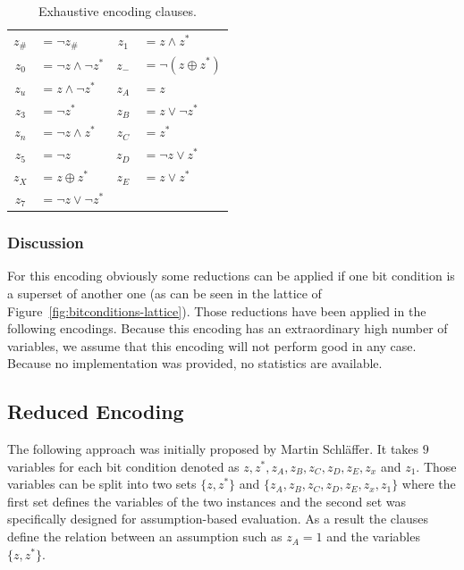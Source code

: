\begin{table}[b]
  \begin{center}
    \begin{tabular}{cp{5cm}cl}
      $z_\#$ & $= \neg z_\#$ &
      $z_1$  & $= z \land z^*$ \\

      $z_0$  & $= \neg z \land \neg z^*$ &
      $z_-$  & $= \neg(z \oplus z^*)$ \\

      $z_u$  & $= z \land \neg z^*$ &
      $z_A$  & $= z$ \\

      $z_3$  & $= \neg z^*$ &
      $z_B$  & $= z \lor \neg z^*$ \\

      $z_n$  & $= \neg z \land z^*$ &
      $z_C$  & $= z^*$ \\

      $z_5$  & $= \neg z$ &
      $z_D$  & $= \neg z \lor z^*$ \\

      $z_X$  & $= z \oplus z^*$ &
      $z_E$  & $= z \lor z^*$ \\

      $z_7$  & $= \neg z \lor \neg z^*$ &
             & \\
    \end{tabular}
    \caption{Exhaustive encoding clauses.}
    \label{tab:exhaustive-encoding-clauses}
  \end{center}
\end{table}

\subsubsection{Discussion}
\label{sec:exhaustive-discussion}
%
For this encoding obviously some reductions can be applied if one bit condition is a superset of another one (as can be seen in the lattice of Figure~\ref{fig:bitconditions-lattice}). Those reductions have been applied in the following encodings. Because this encoding has an extraordinary high number of variables, we assume that this encoding will not perform good in any case. Because no implementation was provided, no statistics are available.

\newpage
\subsection{Reduced Encoding}
\label{sec:encoding:reduced-encoding}
%
The following approach was initially proposed by Martin Schläffer. It takes $9$ variables for each bit condition denoted as $z, z^*, z_A, z_B, z_C, z_D, z_E, z_x$ and $z_1$. Those variables can be split into two sets $\{z, z^*\}$ and $\{z_A, z_B, z_C, z_D, z_E, z_x, z_1\}$ where the first set defines the variables of the two instances and the second set was specifically designed for assumption-based evaluation. As a result the clauses define the relation between an assumption such as $z_A = 1$ and the variables $\{z, z^*\}$.

